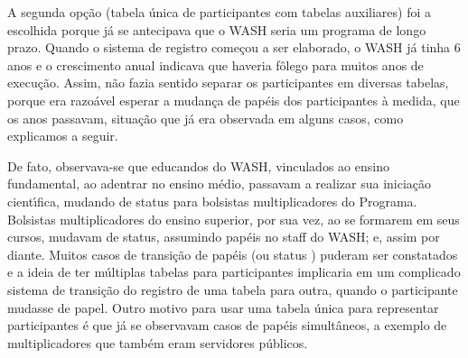 \documentclass[
12pt,		%
openright,	%
twoside,  %
a4paper,			%
chapter=TITLE,		%
english,			%
french,				%
spanish,			%
brazil				%
]{USPSC-classe/USPSC}
\begin{document}
A segunda op\c{c}\~ao (tabela \'unica de participantes com tabelas auxiliares) foi a escolhida porque j\'a se antecipava que o WASH seria um programa de longo prazo. Quando o sistema de registro come\c{c}ou a ser elaborado, o WASH j\'a tinha 6 anos e o crescimento anual indicava que haveria f\^olego para muitos anos de execu\c{c}\~ao. Assim, n\~ao fazia sentido separar os participantes em diversas tabelas, porque era razo\'avel esperar a mudan\c{c}a de pap\'eis dos participantes \`a medida, que os anos passavam, situa\c{c}\~ao que j\'a era observada em alguns casos, como explicamos a seguir.

















De fato, observava-se que educandos do WASH, vinculados ao ensino fundamental, ao adentrar no ensino m\'edio, passavam a realizar sua inicia\c{c}\~ao cient\'{\i}fica, mudando de status para bolsistas multiplicadores do Programa. Bolsistas multiplicadores do ensino superior, por sua vez, ao se formarem em seus cursos, mudavam de status, assumindo pap\'eis no  \textquotedbl staff \textquotedbl  do WASH; e, assim por diante. Muitos casos de transi\c{c}\~ao de pap\'eis (ou \textquotedbl status \textquotedbl ) puderam ser constatados e a ideia de ter m\'ultiplas tabelas para participantes implicaria em um complicado sistema de transi\c{c}\~ao do registro de uma tabela para outra, quando o participante mudasse de papel. Outro motivo para usar uma tabela \'unica para representar participantes \'e que j\'a se observavam casos de pap\'eis simult\^aneos, a exemplo de multiplicadores que tamb\'em eram servidores p\'ublicos.
\end{document}
